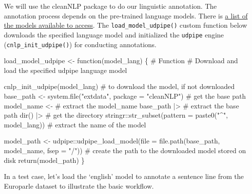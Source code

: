 \documentclass[
  letterpaper,
]{latex/krantz}
\newenvironment{Shaded}{\begin{snugshade}}{\end{snugshade}}
\newcommand{\AttributeTok}[1]{\textcolor[rgb]{0.40,0.45,0.13}{#1}}
\newcommand{\CommentTok}[1]{\textcolor[rgb]{0.37,0.37,0.37}{#1}}
\newcommand{\ControlFlowTok}[1]{\textcolor[rgb]{0.00,0.23,0.31}{#1}}
\newcommand{\FunctionTok}[1]{\textcolor[rgb]{0.28,0.35,0.67}{#1}}
\newcommand{\NormalTok}[1]{\textcolor[rgb]{0.00,0.23,0.31}{#1}}
\newcommand{\OtherTok}[1]{\textcolor[rgb]{0.00,0.23,0.31}{#1}}
\newcommand{\SpecialCharTok}[1]{\textcolor[rgb]{0.37,0.37,0.37}{#1}}
\newcommand{\StringTok}[1]{\textcolor[rgb]{0.13,0.47,0.30}{#1}}
\begin{document}
We will use the cleanNLP package to do our linguistic annotation. The
annotation process depends on the pre-trained language models. There is
\href{https://github.com/bnosac/udpipe\#pre-trained-models}{a list of
the models available to access}. The \texttt{load\_model\_udpipe()}
custom function below downloads the specified language model and
initialized the \texttt{udpipe} engine (\texttt{cnlp\_init\_udpipe()})
for conducting annotations.

\begin{Shaded}
\begin{Highlighting}[]
\NormalTok{load\_model\_udpipe }\OtherTok{\textless{}{-}} \ControlFlowTok{function}\NormalTok{(model\_lang) \{}
  \CommentTok{\# Function}
  \CommentTok{\# Download and load the specified udpipe language model}
  
  \FunctionTok{cnlp\_init\_udpipe}\NormalTok{(model\_lang) }\CommentTok{\# to download the model, if not downloaded}
\NormalTok{base\_path }\OtherTok{\textless{}{-}} \FunctionTok{system.file}\NormalTok{(}\StringTok{"extdata"}\NormalTok{, }\AttributeTok{package =} \StringTok{"cleanNLP"}\NormalTok{) }\CommentTok{\# get the base path}
\NormalTok{  model\_name }\OtherTok{\textless{}{-}} \CommentTok{\# extract the model\_name}
\NormalTok{    base\_path }\SpecialCharTok{|\textgreater{}} \CommentTok{\# extract the base path}
    \FunctionTok{dir}\NormalTok{() }\SpecialCharTok{|\textgreater{}} \CommentTok{\# get the directory}
\NormalTok{    stringr}\SpecialCharTok{::}\FunctionTok{str\_subset}\NormalTok{(}\AttributeTok{pattern =} \FunctionTok{paste0}\NormalTok{(}\StringTok{"\^{}"}\NormalTok{, model\_lang)) }\CommentTok{\# extract the name of the model}
  
\NormalTok{  model\_path }\OtherTok{\textless{}{-}}\NormalTok{ udpipe}\SpecialCharTok{::}\FunctionTok{udpipe\_load\_model}\NormalTok{(}\AttributeTok{file =} \FunctionTok{file.path}\NormalTok{(base\_path, model\_name, }\AttributeTok{fsep =} \StringTok{"/"}\NormalTok{)) }\CommentTok{\# create the path to the downloaded model stored on disk}
    \FunctionTok{return}\NormalTok{(model\_path)}
\NormalTok{\}}
\end{Highlighting}
\end{Shaded}

In a test case, let's load the `english' model to annotate a sentence
line from the Europarle dataset to illustrate the basic workflow.
\end{document}
